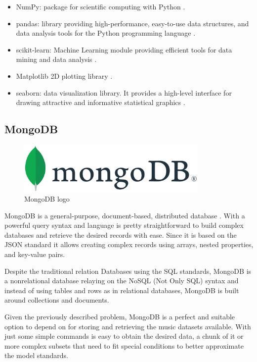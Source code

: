 \begin{itemize}
    \item NumPy: package for scientific computing with Python \cite{numpy}.
    \item pandas: library providing high-performance, easy-to-use data structures, and data analysis tools for the Python programming language \cite{pandas}.
    \item scikit-learn: Machine Learning module providing efficient tools for data mining and data analysis \cite{scikit}.
    \item Matplotlib  2D plotting library \cite{matplotlib}.
    \item seaborn: data visualization library. It provides a high-level interface for drawing attractive and informative statistical graphics \cite{seaborn}.
\end{itemize}


\subsection{MongoDB}

\begin{figure}[th]
    \centering
    \begin{center}
        \includegraphics[height=25mm]{Figures/mongodb}
    \end{center}
    \decoRule
    \caption{MongoDB logo}
    \label{fig:mongodb logo}
\end{figure}

MongoDB is a general-purpose, document-based, distributed database \cite{mongo}.
With a powerful query syntax and language is pretty straightforward to build complex databases and retrieve the desired records with ease.
Since it is based on the JSON\cite{json} standard it allows creating complex records using arrays, nested properties, and key-value pairs.

Despite the traditional relation Databases using the SQL standards, MongoDB is a nonrelational database relaying on the NoSQL (Not Only SQL) syntax and instead of using tables and rows as in relational databases, MongoDB is built around collections and documents.

Given the previously described problem, MongoDB is a perfect and suitable option to depend on for storing and retrieving the music datasets available. With just some simple commands is easy to obtain the desired data, a chunk of it or more complex subsets that need to fit special conditions to better approximate the model standards.

